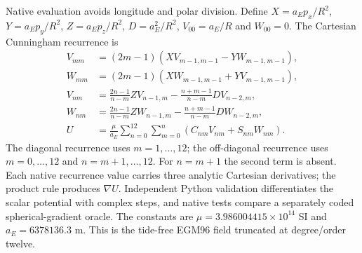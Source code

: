 Native evaluation avoids longitude and polar division. Define
$X=a_Ep_x/R^2$, $Y=a_Ep_y/R^2$, $Z=a_Ep_z/R^2$, $D=a_E^2/R^2$,
$V_{00}=a_E/R$ and $W_{00}=0$. The Cartesian Cunningham recurrence is
\begin{align}
V_{mm}&=(2m-1)(XV_{m-1,m-1}-YW_{m-1,m-1}),\\
W_{mm}&=(2m-1)(XW_{m-1,m-1}+YV_{m-1,m-1}),\\
V_{nm}&=\frac{2n-1}{n-m}ZV_{n-1,m}
-\frac{n+m-1}{n-m}DV_{n-2,m},\\
W_{nm}&=\frac{2n-1}{n-m}ZW_{n-1,m}
-\frac{n+m-1}{n-m}DW_{n-2,m},\\
U&=\frac{\mu}{a_E}\sum_{n=0}^{12}\sum_{m=0}^{n}(C_{nm}V_{nm}+S_{nm}W_{nm}).
\end{align}
The diagonal recurrence uses $m=1,\ldots,12$; the off-diagonal recurrence uses
$m=0,\ldots,12$ and $n=m+1,\ldots,12$.
For $n=m+1$ the second term is absent. Each native recurrence value carries
three analytic Cartesian derivatives; the product rule produces $\nabla U$.
Independent Python validation differentiates the scalar potential with complex
steps, and native tests compare a separately coded spherical-gradient oracle.
The constants are $\mu=3.986004415\times10^{14}$ SI and $a_E=6378136.3$ m.
This is the tide-free EGM96 field truncated at degree/order twelve.

